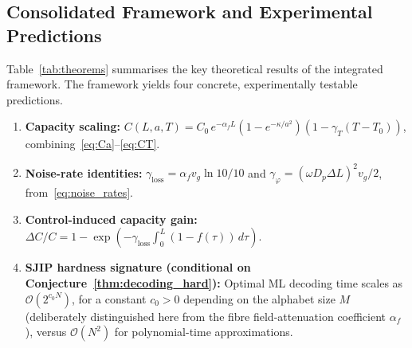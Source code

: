 \documentclass[journal,twocolumn]{IEEEtran}
\theoremstyle{definition}
\theoremstyle{plain}
\newcommand{\alphaf}{\alpha_{f}}
\begin{document}
\subsection{Consolidated Framework and Experimental Predictions}

Table~\ref{tab:theorems} summarises the key theoretical results of
the integrated framework.  The framework yields four concrete,
experimentally testable predictions.
\begin{enumerate}[leftmargin=*, label=(\arabic*), itemsep=2pt]
  \item \textbf{Capacity scaling:}
    $C(L,a,T) = C_0\,e^{-\alphaf L}(1-e^{-\kappa/a^2})
    (1-\gamma_T(T-T_0))$, combining~\eqref{eq:Ca}--\eqref{eq:CT}.
  \item \textbf{Noise-rate identities:}
    $\gamma_{\mathrm{loss}} = \alphaf v_g \ln 10 / 10$ and
    $\gamma_\varphi = (\omega D_p \Delta L)^2 v_g / 2$,
    from~\eqref{eq:noise_rates}.
  \item \textbf{Control-induced capacity gain:}
    $\Delta C/C = 1 - \exp(-\gamma_{\mathrm{loss}}
    \int_0^L(1-f(\tau))\,d\tau)$.
  \item \textbf{SJIP hardness signature (conditional on
    Conjecture~\ref{thm:decoding_hard}):} Optimal ML decoding time
    scales as $\mathcal{O}(2^{c_0 N})$, for a constant $c_0>0$
    depending on the alphabet size $M$ (deliberately distinguished
    here from the fibre field-attenuation coefficient $\alphaf$),
    versus $\mathcal{O}(N^2)$ for polynomial-time approximations.
\end{enumerate}
\end{document}
